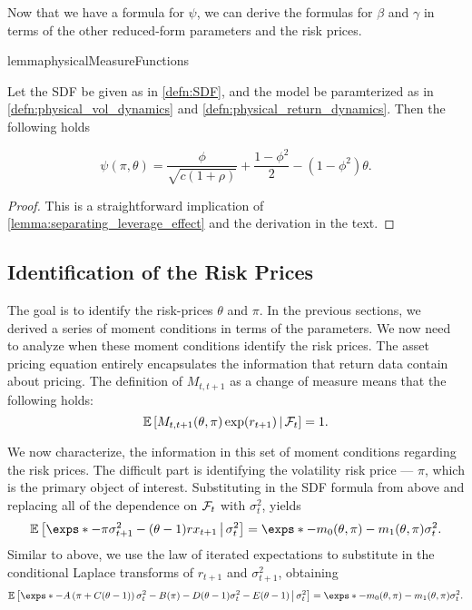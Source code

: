 \documentclass[11pt, letterpaper, twoside]{article}
\begin{document}
Now that we have a formula for $\psi$, we can derive the formulas for $\beta$ and $\gamma$ in terms of the other reduced-form parameters and the risk prices. 

\begin{restatable}{lemma}{physicalMeasureFunctions}

    \label{lemma:psi_function}
    
    Let the SDF be given as in \cref{defn:SDF}, and the model be paramterized as in
    \cref{defn:physical_vol_dynamics} and \cref{defn:physical_return_dynamics}. 
    Then the following holds
    
    \begin{equation}
        \psi(\pi, \theta) = \frac{\phi}{\sqrt{c (1 + \rho)}} + \frac{1 - \phi^2}{2} - (1 - \phi^2) \theta.  
    \end{equation}
\end{restatable}

\begin{proof}
    This is a straightforward implication of \cref{lemma:separating_leverage_effect} and the derivation in the text.
\end{proof}

\subsection{Identification of the Risk Prices}

The goal is to identify the risk-prices $\theta$ and $\pi$. In the previous sections, we derived a series of moment conditions in terms of the parameters. We now need to analyze when these moment conditions identify the risk prices. The asset pricing equation entirely encapsulates the information that return data contain about pricing.  The definition of $M_{t,t+1}$ as a change of measure means that the following holds:
%
\begin{equation}
    \operatorname{\mathbb{E}}\left[ M_{t,t+1}(\theta, \pi) \exp(r_{t+1}) \,\middle\vert\, \mathcal{F}_{t} \right] = 1.
\end{equation}

We now characterize, the information in this set of moment conditions regarding the risk prices. The difficult part is identifying the volatility risk price --- $\pi$, which is the primary object of interest. Substituting in the SDF formula from above and replacing all of the dependence on $\mathcal{F}_t$ with $\sigma^2_t$, yields
%
\begin{equation}
    \E \left[ \exps*{ - \pi \sigma^2_{t+1} - (\theta - 1) rx_{t+1} } \mvert \sigma^2_t \right] = \exps*{- m_0(\theta, \pi) - m_1(\theta, \pi) \sigma^2_t}.
\end{equation}
%
Similar to above, we use the law of iterated expectations to substitute in the conditional Laplace transforms of $r_{t+1}$ and $\sigma^2_{t+1}$, obtaining
%
\begin{equation}
    \E\left[\exps*{- A\left(\pi + C(\theta -1)\right) \sigma^2_t - B(\pi) - D(\theta-1) \sigma^2_t - E(\theta-1)} \mvert \sigma^2_t \right] = \exps*{- m_0(\theta, \pi) - m_1(\theta, \pi) \sigma^2_t}. 
\end{equation}
\end{document}

